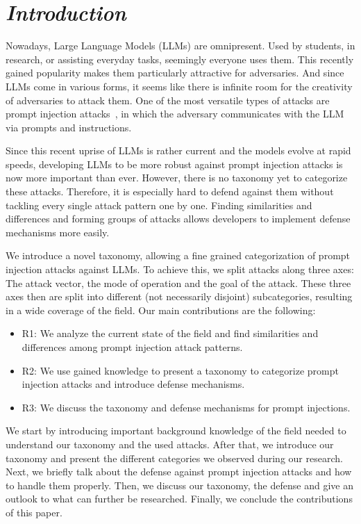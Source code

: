 \section{\textit{Introduction}}
Nowadays, Large Language Models (LLMs) are omnipresent. Used by students, in research,  or assisting everyday tasks, seemingly everyone uses them. 
This recently gained popularity makes them particularly attractive for adversaries. 
And since LLMs come in various forms, it seems like there is infinite room for the creativity of adversaries to attack them. 
One of the most versatile types of attacks are prompt injection attacks~\cite{10.1145/3605764.3623985}, in which the adversary communicates with the LLM via prompts and instructions.

Since this recent uprise of LLMs is rather current and the models evolve at rapid speeds, developing LLMs to be more robust against prompt injection attacks is now more important than ever. However, there is no taxonomy yet to categorize these attacks. 
Therefore, it is especially hard to defend against them without tackling every single attack pattern one by one.
Finding similarities and differences and forming groups of attacks allows developers to implement defense mechanisms more easily. 

We introduce a novel taxonomy, allowing a fine grained categorization of prompt injection attacks against LLMs. 
To achieve this, we split attacks along three axes: The attack vector, the mode of operation and the goal of the attack.
These three axes then are split into different (not necessarily disjoint) subcategories, resulting in a wide coverage of the field. 
Our main contributions are the following:

\begin{itemize}
    \item R1: We analyze the current state of the field and find similarities and differences among prompt injection attack patterns.
    \item R2: We use gained knowledge to present a taxonomy to categorize prompt injection attacks and introduce defense mechanisms.
    \item R3: We discuss the taxonomy and defense mechanisms for prompt injections.
\end{itemize}

We start by introducing important background knowledge of the field needed to understand our taxonomy and the used attacks. 
After that, we introduce our taxonomy and present the different categories we observed during our research.
Next, we briefly talk about the defense against prompt injection attacks and how to handle them properly.
Then, we discuss our taxonomy, the defense and give an outlook to what can further be researched.
Finally, we conclude the contributions of this paper.
